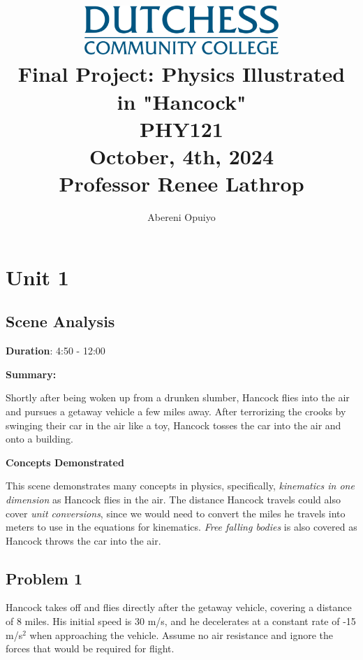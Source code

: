 \documentclass[a4paper,12pt]{article}
\title{
    \vspace{5cm} %
    \includegraphics[width=0.55\textwidth]{dutchess-logo-blue.png} \\ %
    \vspace{1cm} %
    \textbf{\Huge Final Project: Physics Illustrated in "Hancock"} \\
    \vspace{1cm} %
    \large PHY121 \\
    \vspace{0.5cm} %
    \large	October, 4th, 2024 \\ 
		\vspace{.5cm}
		\large Professor Renee Lathrop 
}
\author{Abereni Opuiyo}
\date{}
\begin{document}
\maketitle
	\thispagestyle{plain}
\newpage




\setcounter{secnumdepth}{0}
\setcounter{page}{1}  %
\tableofcontents
\thispagestyle{fancy}
\newpage

\section{Unit 1}

\vspace{-0.5cm}
\singlespacing

\subsection{Scene Analysis}

\textbf{Duration}: 4:50 - 12:00

\vspace{0.3cm}
\noindent\textbf{Summary:} \par
Shortly after being woken up from a drunken slumber, Hancock flies into the air and pursues a getaway vehicle a few miles away. After terrorizing the crooks by swinging their car in the air like a toy, Hancock tosses the car into the air and onto a building.
\par


\vspace{0.3cm}
\noindent\textbf{Concepts Demonstrated} \par
This scene demonstrates many concepts in physics, specifically, \emph{kinematics in one
	dimension} as Hancock flies in the air. The distance Hancock travels could
	also cover \emph{unit conversions}, since we would need to convert the miles
	he travels into meters to use in the equations for kinematics. \emph{Free falling bodies} is also covered as Hancock throws the car into the air.


\subsection{Problem 1}
Hancock takes off and flies directly after the getaway vehicle, covering a distance of 8 miles. His initial speed is 30 m/s, and he decelerates at a constant rate of -15 m/s$^2$ when approaching the vehicle. Assume no air resistance and ignore the forces that would be required for flight. 
\\
\end{document}
